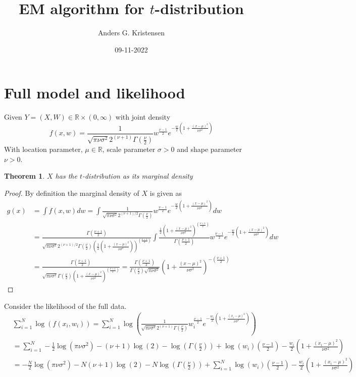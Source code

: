 \documentclass[a4paper, 11 pt]{article}
\title{EM algorithm for $t$-distribution}
\author{Anders G. Kristensen}
\date{09-11-2022}
\newtheorem{theorem}{Theorem}[section]
\begin{document}
\maketitle
\section{Full model and likelihood}
\noindent Given $Y = (X,W)\in\mathbb{R} \times (0,\infty)$ with joint density 
\[
    f(x,w) = \frac{1}{\sqrt{\pi\nu\sigma^2}2^{(\nu+1)}\Gamma(\frac{\nu}{2})}w^{\frac{\nu-1}{2}}e^{-\frac{w}{2}\left(1+\frac{(x-\mu)^2}{\nu\sigma^2}\right)}
\]
With location parameter, $\mu\in\mathbb{R}$, scale parameter $\sigma>0$ and shape parameter $\nu>0$. 
\begin{theorem}
    $X$ has the $t$-distribution as its marginal density
\end{theorem}
\begin{proof}
    By definition the marginal density of $X$ is given as
    \begin{align*}
        g(x) &= \int f(x,w) dw = \int \frac{1}{\sqrt{\pi\nu\sigma^2}2^{(\nu+1)/2}\Gamma(\frac{\nu}{2})}w^{\frac{\nu-1}{2}}e^{-\frac{w}{2}\left(1+\frac{(x-\mu)^2}{\nu\sigma^2}\right)} dw \\
        &= \frac{\Gamma(\frac{\nu+1}{2})}{\sqrt{\pi\nu\sigma^2}2^{(\nu+1)/2}\Gamma(\frac{\nu}{2})\left(\frac{1}{2}\left(1+\frac{(x-\mu)^2}{\nu\sigma^2}\right)\right)^{(\frac{\nu+1}{2})}} \int \frac{\frac{1}{2}\left(1+\frac{(x-\mu)^2}{\nu\sigma^2}\right)^{(\frac{\nu+1}{2})}}{\Gamma(\frac{\nu+1}{2})} w^{\frac{\nu-1}{2}}e^{-\frac{w}{2}\left(1+\frac{(x-\mu)^2}{\nu\sigma^2}\right)}dw\\
        &= \frac{\Gamma(\frac{\nu+1}{2})}{\sqrt{\pi\nu\sigma^2}\Gamma(\frac{\nu}{2})\left(1+\frac{(x-\mu)^2}{\nu\sigma^2}\right)^{(\frac{\nu+1}{2})}} = \frac{\Gamma(\frac{\nu+1}{2})}{\Gamma(\frac{\nu}{2})\sqrt{\pi\nu\sigma^2}}\left(1+\frac{(x-\mu)^2}{\nu\sigma^2}\right)^{-\left(\frac{\nu+1}{2}\right)}
    \end{align*}
\end{proof}
\noindent Consider the likelihood of the full data.
\begin{align*}
    &\sum_{i = 1}^N \log\left(f(x_i,w_i)\right) = \sum_{i = 1}^N \log\left(\frac{1}{\sqrt{\pi\nu\sigma^2}2^{(\nu+1)}\Gamma(\frac{\nu}{2})}w_i^{\frac{\nu-1}{2}}e^{-\frac{w_i}{2}\left(1+\frac{(x_i-\mu)^2}{\nu\sigma^2}\right)}\right) \\
    &= \sum_{i = 1}^N -\frac{1}{2}\log\left(\pi\nu\sigma^2\right) - \left(\nu+1\right)\log\left(2\right)-\log\left(\Gamma\left(\frac{\nu}{2}\right)\right) + \log\left(w_i\right)\left(\frac{\nu-1}{2}\right)-\frac{w_i}{2}\left(1+\frac{(x_i-\mu)^2}{\nu\sigma^2}\right) \\
    &= -\frac{N}{2}\log\left(\pi\nu\sigma^2\right) - N\left(\nu+1\right)\log\left(2\right)-N\log\left(\Gamma\left(\frac{\nu}{2}\right)\right) + \sum_{i = 1}^N \log\left(w_i\right)\left(\frac{\nu-1}{2}\right)-\frac{w_i}{2}\left(1+\frac{(x_i-\mu)^2}{\nu\sigma^2}\right)
\end{align*}
\end{document}
